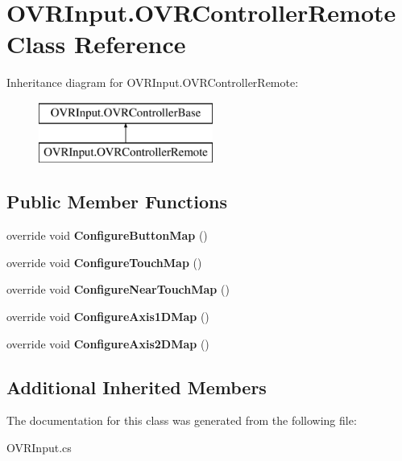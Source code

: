 \hypertarget{class_o_v_r_input_1_1_o_v_r_controller_remote}{}\section{O\+V\+R\+Input.\+O\+V\+R\+Controller\+Remote Class Reference}
\label{class_o_v_r_input_1_1_o_v_r_controller_remote}
Inheritance diagram for O\+V\+R\+Input.\+O\+V\+R\+Controller\+Remote\+:\begin{figure}[H]
\begin{center}
\leavevmode
\includegraphics[height=2.000000cm]{class_o_v_r_input_1_1_o_v_r_controller_remote}
\end{center}
\end{figure}
\subsection*{Public Member Functions}
\begin{DoxyCompactItemize}
\item 
\mbox{\label{class_o_v_r_input_1_1_o_v_r_controller_remote_a4789555b9a9f016f21da850c6b5c4407}} 
override void {\bfseries Configure\+Button\+Map} ()
\item 
\mbox{\label{class_o_v_r_input_1_1_o_v_r_controller_remote_ab9983b618b82e0f971c0b3dd2c7f6b8e}} 
override void {\bfseries Configure\+Touch\+Map} ()
\item 
\mbox{\label{class_o_v_r_input_1_1_o_v_r_controller_remote_ad5e1b1406aa5171738182cf9b7266fdb}} 
override void {\bfseries Configure\+Near\+Touch\+Map} ()
\item 
\mbox{\label{class_o_v_r_input_1_1_o_v_r_controller_remote_a62a177e803c7c0aed053bea42cfed32d}} 
override void {\bfseries Configure\+Axis1\+D\+Map} ()
\item 
\mbox{\label{class_o_v_r_input_1_1_o_v_r_controller_remote_a9036c5791b8d939d5c03c471234a8376}} 
override void {\bfseries Configure\+Axis2\+D\+Map} ()
\end{DoxyCompactItemize}
\subsection*{Additional Inherited Members}


The documentation for this class was generated from the following file\+:\begin{DoxyCompactItemize}
\item 
O\+V\+R\+Input.\+cs\end{DoxyCompactItemize}
